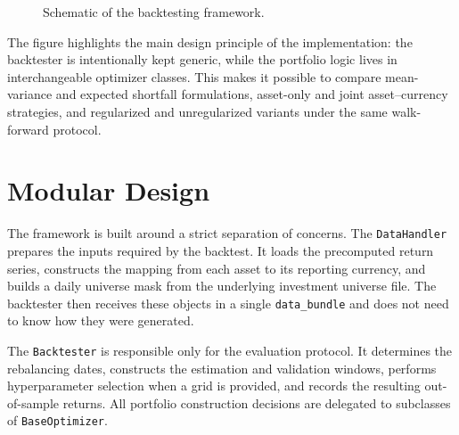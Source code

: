 \begin{figure}[ht]
\begin{center}
\end{center}
\caption{Schematic of the backtesting framework.}
\label{fig:backtest}
\end{figure}

The figure highlights the main design principle of the implementation: the backtester is intentionally kept generic, while the portfolio logic lives in interchangeable optimizer classes. This makes it possible to compare mean-variance and expected shortfall formulations, asset-only and joint asset--currency strategies, and regularized and unregularized variants under the same walk-forward protocol.

\section{Modular Design}

The framework is built around a strict separation of concerns. The \texttt{DataHandler} prepares the inputs required by the backtest. It loads the precomputed return series, constructs the mapping from each asset to its reporting currency, and builds a daily universe mask from the underlying investment universe file. The backtester then receives these objects in a single \texttt{data\_bundle} and does not need to know how they were generated.

The \texttt{Backtester} is responsible only for the evaluation protocol. It determines the rebalancing dates, constructs the estimation and validation windows, performs hyperparameter selection when a grid is provided, and records the resulting out-of-sample returns. All portfolio construction decisions are delegated to subclasses of \texttt{BaseOptimizer}.

